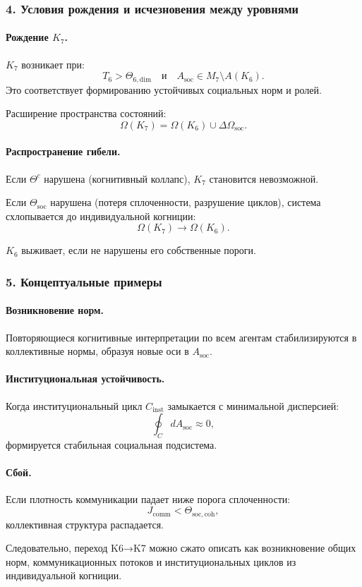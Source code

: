 \subsubsection{4. Условия рождения и исчезновения между уровнями}

\paragraph{Рождение \texorpdfstring{$K_7$}{K_7}.}
$K_7$ возникает при:
\[
T_6 > \Theta_{6,\mathrm{dim}}
\quad\text{и}\quad
A_{\mathrm{soc}} \in M_7 \setminus A(K_6).
\]
Это соответствует формированию устойчивых социальных норм и ролей.

Расширение пространства состояний:
\[
\Omega(K_7) = \Omega(K_6) \cup \Delta\Omega_{\mathrm{soc}}.
\]

\paragraph{Распространение гибели.}
Если $\Theta^{c}$ нарушена (когнитивный коллапс), $K_7$ становится невозможной.

Если $\Theta_{\mathrm{soc}}$ нарушена (потеря сплоченности, разрушение циклов),
система схлопывается до индивидуальной когниции:
\[
\Omega(K_7) \rightarrow \Omega(K_6).
\]

$K_6$ выживает, если не нарушены его собственные пороги.

\subsubsection{5. Концептуальные примеры}

\paragraph{Возникновение норм.}
Повторяющиеся когнитивные интерпретации по всем агентам стабилизируются в
коллективные нормы, образуя новые оси в $A_{\mathrm{soc}}$.

\paragraph{Институциональная устойчивость.}
Когда институциональный цикл $C_{\mathrm{inst}}$ замыкается с минимальной
дисперсией:
\[
\oint_C dA_{\mathrm{soc}} \approx 0,
\]
формируется стабильная социальная подсистема.

\paragraph{Сбой.}
Если плотность коммуникации падает ниже порога сплоченности:
\[
J_{\mathrm{comm}} < \Theta_{\mathrm{soc,coh}},
\]
коллективная структура распадается.

Следовательно, переход K6→K7 можно сжато описать как возникновение
общих норм, коммуникационных потоков и институциональных циклов из
индивидуальной когниции.
